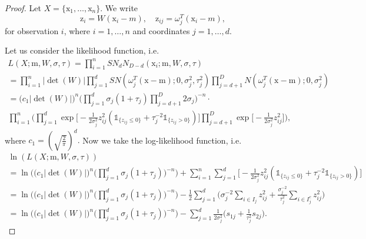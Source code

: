 \documentclass[12pt]{article}
\def\w{\omega}
\def\x{\mathrm{x}}
\def\m{\mathrm{m}}
\def\z{\mathrm{z}}
\def\1{\mathds{1}}
\theoremstyle{definition}
\def\w{\omega}
\begin{document}
\begin{proof}
Let $X=\{ \x_1, \ldots, \x_n \}$.
We write 
$$
\z_i= W(\x_i-m), \quad \z_{ij}= \w_j^T(\x_i-m),
$$
for observation $i$, where $i=1,\ldots,n$ and coordinates $j=1,\ldots,d$.

Let us consider the likelihood function, i.e. 
$$
\begin{array}{l}
L(X;\m,W,\sigma,\tau) = \prod\limits_{i=1}^{n}  SN_{d}N_{D-d}(\x_i ; \m,W,\sigma,\tau) \\[6pt] 
=\prod\limits_{i=1}^{n} | \det(W) | \prod_{j=1}^{d} SN(\w_j^T(\x-\m);0,\sigma_j^2,\tau_j^2)\prod_{j=d+1}^{D} N(\w_j^T(\x-\m);0,\sigma_j^2)  \\[6pt] 
=\Big( c_1|\det(W)| \Big)^{n} \Big( \prod\limits_{j=1}^{d} \sigma_j(1+\tau_j) \prod\limits_{j=d+1}^{D}  2\sigma_j \Big)^{-n} \cdot \\[6pt] 
\prod\limits_{i=1}^{n} 
\Big(
\prod\limits_{j=1}^{d} \exp \Big[ -\frac{1}{2\sigma_j^2}z_{ij}^2 (\1_{ \{ z_{ij} \leq 0 \} } + \tau_{j}^{-2} \1_{ \{ z_{ij} > 0 \} }) \Big]
\prod\limits_{j=d+1}^{D} \exp \Big[ -\frac{1}{2\sigma_j^2}z_{ij}^2  \Big]
\Big),
\end{array}
$$
where 
$
c_1=\left( \sqrt{\tfrac{2}{\pi}} \right)^{d}.
$
Now we take the log-likelihood function, i.e.
$$
\begin{array}{l}
\ln(L(X;\m,W,\sigma,\tau)) \\[6pt]
=\ln \bigg( \Big( c_1|\det(W)| \Big)^{n} \Big( \prod\limits_{j=1}^{d} \sigma_j(1+\tau_j) \Big)^{-n} \bigg) + %
 \sum\limits_{i=1}^{n} \sum\limits_{j=1}^{d} \Big[ -\frac{1}{2\sigma_j^2}z_{ij}^2 (\1_{ \{ z_{ij} \leq 0 \} } + \tau_{j}^{-2} \1_{ \{ z_{ij} > 0 \} })\Big]  \\[6pt]
= \ln \bigg( \Big( c_1|\det(W)| \Big)^{n} \Big( \prod\limits_{j=1}^{d} \sigma_j(1+\tau_j) \Big)^{-n} \bigg)  -%
  \frac{1}{2} \sum\limits_{j=1}^{d} \Big( \sigma_j^{-2} \sum\limits_{i \in I_{j}}    z_{ij}^2   + \frac{\sigma_j^{-2}}{\tau_{j}^{2} }  \sum\limits_{i \in I_{j}^{c}}   z_{ij}^2  \Big) \\[6pt]
= \ln \bigg( \Big( c_1|\det(W)| \Big)^{n} \Big( \prod\limits_{j=1}^{d} \sigma_j(1+\tau_j) \Big)^{-n} \bigg)  - 
 \sum\limits_{j=1}^{d} \frac{1}{2\sigma_j^{2}} \Big(  s_{1j}  + \frac{1}{\tau_{j}^{2} }  s_{2j}  \Big).
\end{array}
$$


\end{proof}
\end{document}
